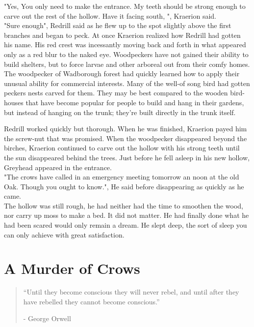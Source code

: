 \documentclass[smalldemyvopaper,11pt,twoside,onecolumn,openright,extrafontsizes]{memoir}
\begin{document}
"Yes, You only need to make the entrance. My teeth should be strong enough to carve out the rest of the hollow. Have it facing south, ", Kraerion said.\\

"Sure enough", Redrill said as he flew up to the spot slightly above the first branches and began to peck. At once Kraerion realized how Redrill had gotten his name. His red crest was incessantly moving back and forth in what appeared only as a red blur to the naked eye. Woodpeckers have not gained their ability to build shelters, but to force larvae and other arboreal out from their comfy homes. The woodpecker of Wadborough forest had quickly learned how to apply their unusual ability for commercial interests. Many of the well-of song bird had gotten peckers nests carved for them. They may be best compared to the wooden bird-houses that have become popular for people to build and hang in their gardens, but instead of hanging on the trunk; they're built directly in the trunk itself.

Redrill worked quickly but thorough. When he was finished, Kraerion payed him the screw-nut that was promised. When the woodpecker disappeared beyond the birches, Kraerion continued to carve out the hollow with his strong teeth until the sun disappeared behind the trees. Just before he fell asleep in his new hollow, Greyhead appeared in the entrance. \\

"The crows have called in an emergency meeting tomorrow an noon at the old Oak. Though you ought to know.", He said before disappearing as quickly as he came.\\

The hollow was still rough, he had neither had the time to smoothen the wood, nor carry up moss to make a bed. It did not matter. He had finally done what he had been scared would only remain a dream. He slept deep, the sort of sleep you can only achieve with great satisfaction.  

\chapter{A Murder of Crows}

\vspace{-1.3cm}
\begin{localsize}{10}
	\begin{quote}
		 “Until they become conscious they will never rebel, and until after they have rebelled they cannot become conscious.” 
		\begin{flushright}- George Orwell \end{flushright}
	\end{quote} 
\end{localsize}
\vspace{1cm}
\end{document}
